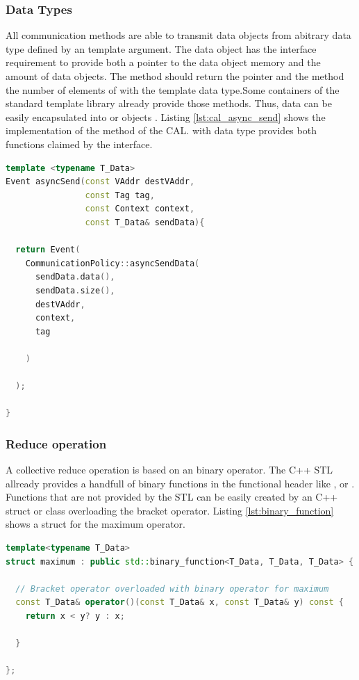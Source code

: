 \subsubsection{Data Types}
All communication methods are able to transmit data objects from
abitrary data type defined by an template argument. The data object
has the interface requirement to provide both a pointer to the data
object memory and the amount of data objects. The method 
should return the pointer and the method  the number of
elements of with the template data type.Some containers of the
standard template library already provide those methods. Thus, data
can be easily encapsulated into  or 
objects \cite{ref:vector, ref:array}. Listing \ref{lst:cal_async_send}
shows the implementation of the  method of the CAL.
 with data type  provides both functions
claimed by the interface.

\begin{lstlisting}[language=C++, breaklines=false, label={lst:cal_async_send}]
template <typename T_Data>
Event asyncSend(const VAddr destVAddr, 
                const Tag tag, 
                const Context context, 
                const T_Data& sendData){

  return Event(
    CommunicationPolicy::asyncSendData(
      sendData.data(),
      sendData.size(), 
      destVAddr, 
      context, 
      tag
      
    )
      
  );

}
\end{lstlisting}

\subsubsection{Reduce operation}
A collective reduce operation is based on an binary operator. The C++
STL allready provides a handfull of binary functions in the functional
header like ,  or 
\cite{ref:functional}. Functions that are not provided by the STL can
be easily created by an C++ struct or class overloading the bracket
operator. Listing \ref{lst:binary_function} shows a struct for
the maximum operator.

\begin{lstlisting}[language=C++, breaklines=false, label={lst:binary_function}]
template<typename T_Data>
struct maximum : public std::binary_function<T_Data, T_Data, T_Data> {

  // Bracket operator overloaded with binary operator for maximum
  const T_Data& operator()(const T_Data& x, const T_Data& y) const {
    return x < y? y : x;

  }

};
\end{lstlisting}

